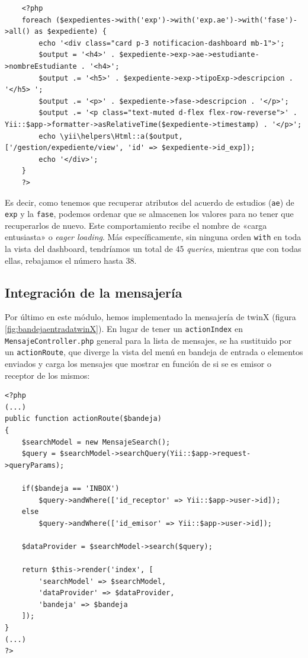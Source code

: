\begin{verbatim}
	<?php
	foreach ($expedientes->with('exp')->with('exp.ae')->with('fase')->all() as $expediente) {
		echo '<div class="card p-3 notificacion-dashboard mb-1">';
		$output = '<h4>' . $expediente->exp->ae->estudiante->nombreEstudiante . '<h4>';
		$output .= '<h5>' . $expediente->exp->tipoExp->descripcion . '</h5> ';
		$output .= '<p>' . $expediente->fase->descripcion . '</p>';
		$output .= '<p class="text-muted d-flex flex-row-reverse">' . Yii::$app->formatter->asRelativeTime($expediente->timestamp) . '</p>';
		echo \yii\helpers\Html::a($output, ['/gestion/expediente/view', 'id' => $expediente->id_exp]);
		echo '</div>';
	}
	?>
\end{verbatim}

Es decir, como tenemos que recuperar atributos del acuerdo de estudios (\texttt{ae}) de \texttt{exp} y la \texttt{fase}, podemos ordenar que se almacenen los valores para no tener que recuperarlos de nuevo. Este comportamiento recibe el nombre de «carga entusiasta» o \textit{eager loading}. Más específicamente, sin ninguna orden \texttt{with} en toda la vista del dashboard, tendríamos un total de 45 \textit{queries}, mientras que con todas ellas, rebajamos el número hasta 38.

\subsection{Integración de la mensajería}

Por último en este módulo, hemos implementado la mensajería de twinX (figura \ref{fig:bandejaentradatwinX}). En lugar de tener un \texttt{actionIndex} en \texttt{MensajeController.php} general para la lista de mensajes, se ha sustituido por un \texttt{actionRoute}, que diverge la vista del menú en bandeja de entrada o elementos enviados y carga los mensajes que mostrar en función de si se es emisor o receptor de los mismos:

\begin{verbatim}
<?php
(...)
public function actionRoute($bandeja)
{
	$searchModel = new MensajeSearch();
	$query = $searchModel->searchQuery(Yii::$app->request->queryParams);
	
	if($bandeja == 'INBOX')
		$query->andWhere(['id_receptor' => Yii::$app->user->id]);
	else
		$query->andWhere(['id_emisor' => Yii::$app->user->id]);
	
	$dataProvider = $searchModel->search($query);
	
	return $this->render('index', [
		'searchModel' => $searchModel,
		'dataProvider' => $dataProvider,
		'bandeja' => $bandeja
	]);
}
(...)
?>
\end{verbatim}


